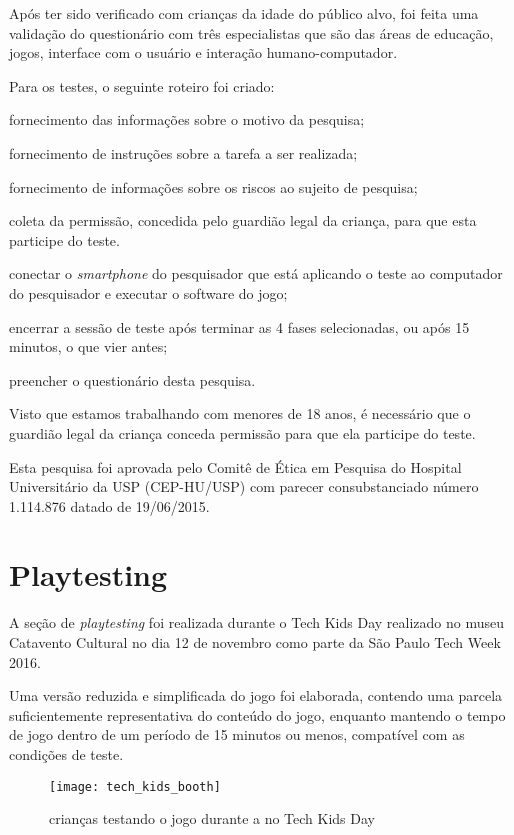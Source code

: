 Após ter sido verificado com crianças da idade do público alvo, 
foi feita uma validação do questionário com três especialistas 
que são das áreas de educação, jogos, interface com o usuário e 
interação humano-computador.

Para os testes, o seguinte roteiro foi criado:

\begin{alineas}
	\item fornecimento das informações sobre o motivo da pesquisa;
	\item fornecimento de instruções sobre a tarefa a ser realizada;
	\item fornecimento de informações sobre os riscos ao sujeito de pesquisa;
	\item coleta da permissão, concedida pelo guardião legal da criança, para que esta participe do teste.
	\item conectar o \textit{smartphone} do pesquisador que está aplicando o teste ao computador do pesquisador e executar o software do jogo; 
	\item encerrar a sessão de teste após terminar as 4 fases selecionadas, ou após 15 minutos, o que vier antes;
	\item preencher o questionário desta pesquisa.
\end{alineas}

Visto que estamos trabalhando com menores de 18 anos, é necessário 
que o guardião legal da criança conceda permissão para que ela 
participe do teste.	

Esta pesquisa foi aprovada pelo Comitê de Ética em Pesquisa do 
Hospital Universitário da USP (CEP-HU/USP) com parecer 
consubstanciado número 1.114.876 datado de 19/06/2015.

\section{Playtesting}\label{sec-playtesting}

A seção de \textit{playtesting} foi realizada durante o Tech Kids Day 
realizado no museu Catavento Cultural no dia 12 de novembro como parte 
da São Paulo Tech Week 2016. 

Uma versão reduzida e simplificada do jogo foi elaborada, contendo uma 
parcela suficientemente representativa do conteúdo do jogo, enquanto 
mantendo o tempo de jogo dentro de um período de 15 minutos ou menos, 
compatível com as condições de teste.

\begin{figure}[h]
	\centering
	\caption{crianças testando o jogo durante a no Tech Kids Day}
	\texttt{[image: tech\_kids\_booth]}
	\legend{\fonteAP}
	\label{fig:tech-kids-day}
\end{figure}

